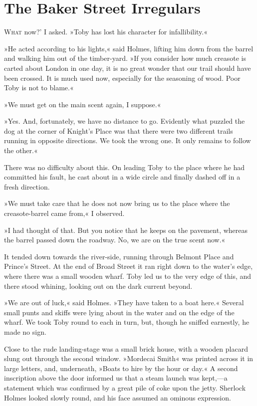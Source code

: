 \chapter{The Baker Street Irregulars}

\lettrine[ante=`,lines=4]{W}{hat} now?' I asked. »Toby has lost his character for infallibility.«

\zz
»He acted according to his lights,« said Holmes, lifting him down from the barrel and walking him out of the timber-yard. »If you consider how much creasote is carted about London in one day, it is no great wonder that our trail should have been crossed. It is much used now, especially for the seasoning of wood. Poor Toby is not to blame.«

»We must get on the main scent again, I suppose.«

»Yes. And, fortunately, we have no distance to go. Evidently what puzzled the dog at the corner of Knight's Place was that there were two different trails running in opposite directions. We took the wrong one. It only remains to follow the other.«

There was no difficulty about this. On leading Toby to the place where he had committed his fault, he cast about in a wide circle and finally dashed off in a fresh direction.

»We must take care that he does not now bring us to the place where the creasote-barrel came from,« I observed.

»I had thought of that. But you notice that he keeps on the pavement, whereas the barrel passed down the roadway. No, we are on the true scent now.«

It tended down towards the river-side, running through Belmont Place and Prince's Street. At the end of Broad Street it ran right down to the water's edge, where there was a small wooden wharf. Toby led us to the very edge of this, and there stood whining, looking out on the dark current beyond.

»We are out of luck,« said Holmes. »They have taken to a boat here.« Several small punts and skiffs were lying about in the water and on the edge of the wharf. We took Toby round to each in turn, but, though he sniffed earnestly, he made no sign.

Close to the rude landing-stage was a small brick house, with a wooden placard slung out through the second window. »Mordecai Smith« was printed across it in large letters, and, underneath, »Boats to hire by the hour or day.« A second inscription above the door informed us that a steam launch was kept,—a statement which was confirmed by a great pile of coke upon the jetty. Sherlock Holmes looked slowly round, and his face assumed an ominous expression.

